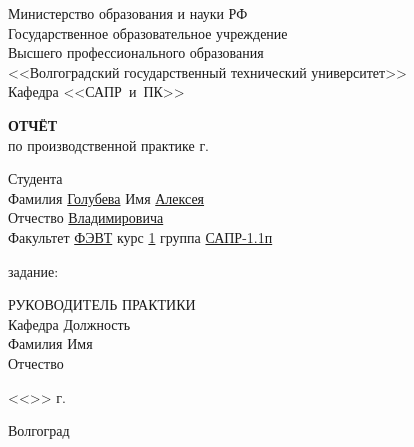 \begin{titlepage}
    \begin{center}
        Министерство образования и науки РФ \\
        Государственное образовательное учреждение\\
        Высшего профессионального образования\\
        <<Волгоградский государственный технический университет>>\\
        Кафедра <<САПР~и~ПК>>
    \end{center}
    \vspace{2.0cm}
    \begin{center}
        \large \textbf{ОТЧЁТ} \\
        по производственной практике \the\year г.
    \end{center}
    \begin{flushleft}
        Студента\\
        Фамилия \underline{Голубева\hspace{3.1cm}} 
        Имя \underline{Алексея\hspace{2.1cm}}\\
        Отчество \underline{Владимировича\hspace{1.6cm}}\\
        Факультет \underline{ФЭВТ\hspace{3.45cm}} курс \underline{1\hspace{1.5cm}} 
        группа \underline{САПР-1.1п\hspace{1.9cm}}\\
    \end{flushleft}
    \vspace{1.0cm}
     задание: \underline{\hspace{11.25cm}}\\
    \underline{\hspace{\textwidth}}
    \vspace{1.0cm}
    \begin{flushleft}
        РУКОВОДИТЕЛЬ ПРАКТИКИ\\
        Кафедра \underline{\hspace{5.15cm}} Должность \underline{\hspace{5cm}} \\
        Фамилия \underline{\hspace{5cm}} Имя \underline{\hspace{6.5cm}}\\
        Отчество \underline{\hspace{5cm}}
    \end{flushleft}
    \vspace{1.5cm}
    \begin{flushright}
        <<\underline{\hspace{1.0cm}}>>\underline{\hspace{4.0cm}} \the\year г.
    \end{flushright}
    \vspace{\fill}
    \begin{center}
        Волгоград \the\year
    \end{center}
\end{titlepage}